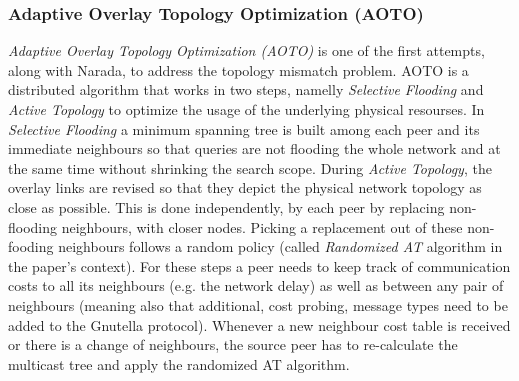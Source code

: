 \subsubsection{Adaptive Overlay Topology Optimization (AOTO)}
\emph{Adaptive Overlay Topology Optimization (AOTO)} \cite{liu_aoto_2003} is one
of the first attempts, along with Narada, to address the topology mismatch
problem. AOTO is a distributed algorithm that works in two steps, namelly
\emph{Selective Flooding} and \emph{Active Topology} to optimize the usage of
the underlying physical resourses. In \emph{Selective Flooding} a minimum
spanning tree is built among each peer and its immediate neighbours so that
queries are not flooding the whole network and at the same time without
shrinking the search scope. During \emph{Active Topology}, the overlay
links are revised so that they depict the physical network topology as close as
possible. This is done independently, by each peer by replacing non-flooding
neighbours, with closer nodes. Picking a replacement out of these non-fooding
neighbours follows a random policy (called \emph{Randomized AT} algorithm in the
paper's context). For these steps a peer needs to keep track of communication
costs to all its neighbours (e.g. the network delay) as well as between any
pair of neighbours (meaning also that additional, cost probing, message types
need to be added to the Gnutella protocol). Whenever a new neighbour cost table
is received or there is a change of neighbours, the source peer has to
re-calculate the multicast tree and apply the randomized AT algorithm.

%
%
%


